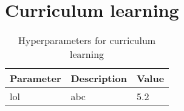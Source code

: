 \section{Curriculum learning}
\label{sec:curriculum_learning}

\begin{table}[htp]
\caption{Hyperparameters for curriculum learning}
\begin{center}
\begin{adjustbox}{max width=\textwidth}
\begin{tabular}{l l l}\hline
 		 Parameter & Description & Value\\\hline
 		 lol & abc & 5.2 \\\hline
\end{tabular}
\end{adjustbox}
\end{center}
\label{tab:curriculum_parameters}
\end{table}